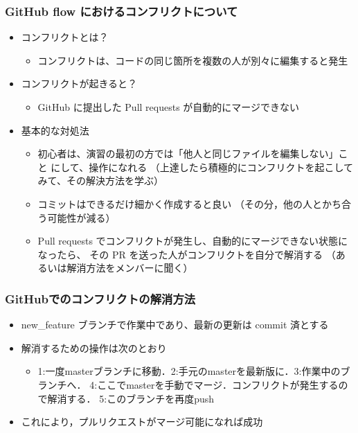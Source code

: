 \documentclass[a4paper,twoside,twocolumn]{bxjsarticle}
\begin{document}
\subsubsection{GitHub flow におけるコンフリクトについて}
\label{sec-2-4-1}
\begin{itemize}
\item コンフリクトとは？
\begin{itemize}
\item コンフリクトは、コードの同じ箇所を複数の人が別々に編集すると発生
\end{itemize}
\item コンフリクトが起きると？
\begin{itemize}
\item GitHub に提出した Pull requests が自動的にマージできない
\end{itemize}
\item 基本的な対処法
\begin{itemize}
\item 初心者は、演習の最初の方では「他人と同じファイルを編集しない」こと
にして、操作になれる
（上達したら積極的にコンフリクトを起こしてみて、その解決方法を学ぶ）
\item コミットはできるだけ細かく作成すると良い
（その分，他の人とかち合う可能性が減る）
\item Pull requests でコンフリクトが発生し、自動的にマージできない状態に
なったら、 その PR を送った人がコンフリクトを自分で解消する
（あるいは解消方法をメンバーに聞く）
\end{itemize}
\end{itemize}
\subsubsection{GitHubでのコンフリクトの解消方法}
\label{sec-2-4-2}
\begin{itemize}
\item new\_feature ブランチで作業中であり、最新の更新は commit 済とする

\item 解消するための操作は次のとおり
\begin{itemize}
\item 1:一度masterブランチに移動．2:手元のmasterを最新版に．3:作業中のブランチへ．
4:ここでmasterを手動でマージ．コンフリクトが発生するので解消する．
5:このブランチを再度push
\end{itemize}
\item これにより，プルリクエストがマージ可能になれば成功
\end{itemize}
\end{document}
